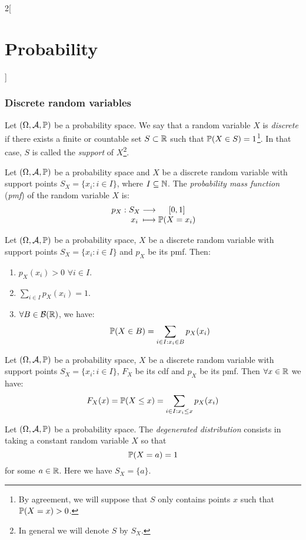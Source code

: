 \documentclass[../../../main.tex]{subfiles}
\begin{document}
\begin{multicols}{2}[\section{Probability}]
  \subsubsection{Discrete random  variables}
  \begin{definition}
    Let $(\Omega,\mathcal{A},\mathbb{P})$ be a probability space. We say that a random variable $X$ is \emph{discrete} if there exists a finite or countable set $S\subset\mathbb{R}$ such that $\mathbb{P}(X\in S)=1$\footnote{By agreement, we will suppose that $S$ only contains points $x$ such that $\mathbb{P}(X=x)>0$.}. In that case, $S$ is called the \emph{support} of $X$\footnote{In general we will denote $S$ by $S_X$.}.
  \end{definition}
  \begin{definition}
    Let $(\Omega,\mathcal{A},\mathbb{P})$ be a probability space and $X$ be a discrete random variable with support points $S_X=\{x_i:i\in I\}$, where $I\subseteq\mathbb{N}$. The \emph{probability mass function} (\emph{pmf}) of the random variable $X$ is:
    $$
      \function{p_X}{S_X}{[0,1]}{x_i}{\Prob(X=x_i)}
    $$
  \end{definition}
  \begin{proposition}
    Let $(\Omega,\mathcal{A},\mathbb{P})$ be a probability space, $X$ be a discrete random variable with support points $S_X=\{x_i:i\in I\}$ and $p_X$ be its pmf. Then:
    \begin{enumerate}
      \item $p_X(x_i)>0$ $\forall i\in I$.
      \item $\displaystyle\sum_{i\in I}p_X(x_i)=1$.
      \item $\forall B\in\mathcal{B}(\mathbb{R})$, we have: $$\mathbb{P}(X\in B)=\sum_{i\in I:x_i\in B}p_X(x_i)$$
    \end{enumerate}
  \end{proposition}
  \begin{corollary}
    Let $(\Omega,\mathcal{A},\mathbb{P})$ be a probability space, $X$ be a discrete random variable with support points $S_X=\{x_i:i\in I\}$, $F_X$ be its cdf and $p_X$ be its pmf. Then $\forall x\in\mathbb{R}$ we have: $$F_X(x)=\mathbb{P}(X\leq x)=\sum_{i\in I:x_i\leq x}p_X(x_i)$$
  \end{corollary}
  \begin{definition}
    Let $(\Omega,\mathcal{A},\mathbb{P})$ be a probability space. The \emph{degenerated distribution} consists in taking a constant random variable $X$ so that $$\mathbb{P}(X=a)=1$$ for some $a\in\mathbb{R}$. Here we have $S_X=\{a\}$.

\end{definition}
\end{multicols}
\end{document}
